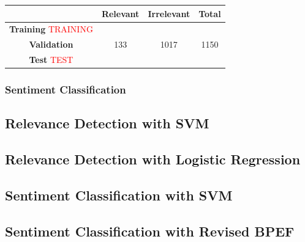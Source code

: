 \begin{center}
	\begin{tabular}{ | c  c  c | c | } 
		\hline
		& \textbf{Relevant} & \textbf{Irrelevant} & \textbf{Total} \\
		\hline
		
		\textbf{Training} \textcolor{red}{TRAINING} &  &  &  \\ 
		\hline
		\textbf{Validation} & 133 & 1017 & 1150 \\ 
		\hline
		\textbf{Test} \textcolor{red}{TEST} &  &  & \\
		\hline
	\end{tabular}
\end{center}



\subsubsection{Sentiment Classification}







\subsection{Relevance Detection with SVM}




\subsection{Relevance Detection with Logistic Regression}




\subsection{Sentiment Classification with SVM}




\subsection{Sentiment Classification with Revised BPEF}

